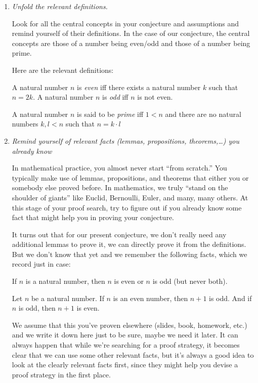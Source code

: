 \begin{enumerate}[{\thesection}.1]
\begin{enumerate}[\thesection.{7}.1]
			\item \emph{Unfold the relevant definitions.}
						
				Look for all the central concepts in your conjecture and assumptions and remind yourself of their definitions. In the case of our conjecture, the central concepts are those of a number being even/odd and those of a number being prime.
				
				Here are the relevant definitions:
				
				\begin{definition}
				A natural number $n$ is \emph{even} iff there exists a natural number $k$ such that $n=2k$. A natural number $n$ is \emph{odd} iff $n$ is not even.
				\end{definition}
				
				\begin{definition}
				A natural number $n$ is said to be \emph{prime} iff $1<n$ and  there are no natural numbers $k,l<n$ such that $n=k\cdot l$
				\end{definition}
							
			\item \emph{Remind yourself of relevant facts (lemmas, propositions, theorems,\dots) you already know}
			
				In mathematical practice, you almost never start ``from scratch.'' You typically make use of lemmas, propositions, and theorems that either you or somebody else proved before. In mathematics, we truly ``stand on the shoulder of giants'' like Euclid, Bernoulli, Euler, and many, many others. At this stage of your proof search, try to figure out if you already know some fact that might help you in proving your conjecture.
				
				It turns out that for our present conjecture, we don't really need any additional lemmas to prove it, we can directly prove it from the definitions. But we don't know that yet and we remember the following facts,  which we record just in case:
				
				\begin{proposition}
				If $n$ is a natural number, then $n$ is even or $n$ is odd (but never both).
				\end{proposition}
				\begin{proposition}
				Let $n$ be a natural number. If $n$ is an even number, then $n+1$ is odd. And if $n$ is odd, then $n+1$ is even.
				\end{proposition}
				
								
				We assume that this you've proven elsewhere (slides, book, homework, etc.) and we write it down here just to be sure, maybe we need it later. It can always happen that while we're searching for a proof strategy, it becomes clear that we can use some other relevant facts, but it's always a good idea to look at the clearly relevant facts first, since they might help you devise a proof strategy in the first place.
				

\end{enumerate}
\end{enumerate}
